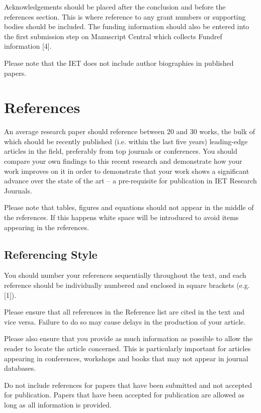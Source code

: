 \documentclass{cta-author}
\begin{document}
Acknowledgements should be placed after the conclusion and before the
references section. This is where reference to any grant numbers or
supporting bodies should be included. The funding information should also be
entered into the first submission step on Manuscript Central which collects
Fundref information [4].

Please note that the IET does not include author biographies in published
papers.


\section{References}\label{sec12}

An average research paper should reference between 20 and 30 works, the bulk
of which should be recently published (i.e. within the last five years)
leading-edge articles in the field, preferably from top journals or
conferences. You should compare your own findings to this recent research
and demonstrate how your work improves on it in order to demonstrate that
your work shows a significant advance over the state of the art -- a
pre-requisite for publication in IET Research Journals.

Please note that tables, figures and equations should not appear in the
middle of the references. If this happens white space will be introduced to
avoid items appearing in the references.

\subsection{Referencing Style}\label{subsec12.1}

You should number your references sequentially throughout the text, and each
reference should be individually numbered and enclosed in square brackets
(e.g. [1]).

Please ensure that all references in the Reference list are cited in the
text and vice versa. Failure to do so may cause delays in the production of
your article.

Please also ensure that you provide as much information as possible to allow
the reader to locate the article concerned. This is particularly important
for articles appearing in conferences, workshops and books that may not
appear in journal databases.

Do not include references for papers that have been submitted and not
accepted for publication. Papers that have been accepted for publication are
allowed as long as all information is provided.
\end{document}
